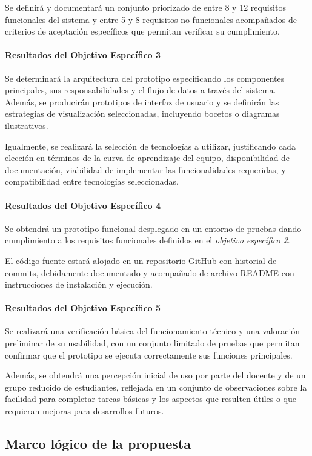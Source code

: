 Se definirá y documentará un conjunto priorizado de entre 8 y 12 requisitos funcionales del sistema y entre 5 y 8 requisitos no funcionales acompañados de criterios de aceptación específicos que permitan verificar su cumplimiento.

\paragraph{Resultados del Objetivo Específico 3}

Se determinará la arquitectura del prototipo especificando los componentes principales, sus responsabilidades y el flujo de datos a través del sistema. Además, se producirán prototipos de interfaz de usuario y se definirán las estrategias de visualización seleccionadas, incluyendo bocetos o diagramas ilustrativos.

Igualmente, se realizará la selección de tecnologías a utilizar, justificando cada elección en términos de la curva de aprendizaje del equipo, disponibilidad de documentación, viabilidad de implementar las funcionalidades requeridas, y compatibilidad entre tecnologías seleccionadas.

\paragraph{Resultados del Objetivo Específico 4}

Se obtendrá un prototipo funcional desplegado en un entorno de pruebas dando cumplimiento a los requisitos funcionales definidos en el \textit{objetivo específico 2}.

El código fuente estará alojado en un repositorio GitHub con historial de commits, debidamente documentado y acompañado de archivo README con instrucciones de instalación y ejecución.

\paragraph{Resultados del Objetivo Específico 5}

Se realizará una verificación básica del funcionamiento técnico y una valoración preliminar de su usabilidad, con un conjunto limitado de pruebas que permitan confirmar que el prototipo se ejecuta correctamente sus funciones principales.

Además, se obtendrá una percepción inicial de uso por parte del docente y de un grupo reducido de estudiantes, reflejada en un conjunto de observaciones sobre la facilidad para completar tareas básicas y los aspectos que resulten útiles o que requieran mejoras para desarrollos futuros.

\subsection{Marco lógico de la propuesta}



